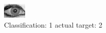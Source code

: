 \begin{figure}[h!]
\begin{center}
\includegraphics[width=0.60\columnwidth]{figures/ID2029_class_1_target_2.png}
\end{center}
\caption{ Classification: 1 actual target: 2}
\label{fig:ID2029_class_1_target_2}
\end{figure}
